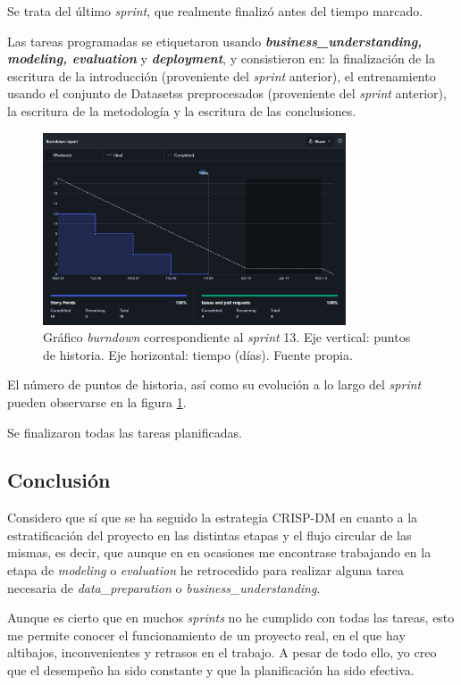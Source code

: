 Se trata del último \textit{sprint}, que realmente finalizó antes del tiempo marcado.

Las tareas programadas se etiquetaron usando \textbf{\textit{business\_understanding, modeling, evaluation}} y \textbf{\textit{deployment}}, y consistieron en: la finalización de la escritura de la introducción (proveniente del \textit{sprint} anterior), el entrenamiento usando el conjunto de Datasetss preprocesados (proveniente del \textit{sprint} anterior), la escritura de la metodología y la escritura de las conclusiones.

\begin{figure}[h]
    \centering
    \includegraphics[width=0.8\textwidth]{img/bd_5jun.png}
    \caption{Gráfico \textit{burndown} correspondiente al \textit{sprint} 13. Eje vertical: puntos de historia. Eje horizontal: tiempo (días). Fuente propia.}
    \label{fig:bd_13}
\end{figure}

El número de puntos de historia, así como su evolución a lo largo del \textit{sprint} pueden observarse en la figura \ref{fig:bd_13}.

Se finalizaron todas las tareas planificadas.

\subsection{Conclusión}

Considero que sí que se ha seguido la estrategia CRISP-DM en cuanto a la estratificación del proyecto en las distintas etapas y el flujo circular de las mismas, es decir, que aunque en en ocasiones me encontrase trabajando en la etapa de \textit{modeling} o \textit{evaluation} he retrocedido para realizar alguna tarea necesaria de \textit{data\_preparation} o \textit{business\_understanding}.

Aunque es cierto que en muchos \textit{sprints} no he cumplido con todas las tareas, esto me permite conocer el funcionamiento de un proyecto real, en el que hay altibajos, inconvenientes y retrasos en el trabajo. A pesar de todo ello, yo creo que el desempeño ha sido constante y que la planificación ha sido efectiva.

